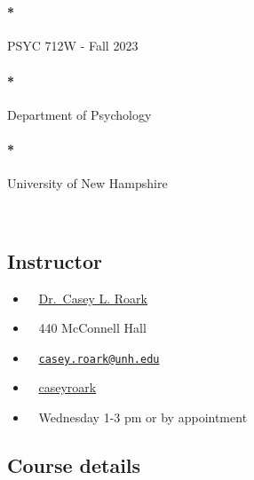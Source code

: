 \documentclass[
  letterpaper,
  DIV=11,
  numbers=noendperiod]{scrreprt}
\let\oldparagraph\paragraph
\renewcommand{\paragraph}[1]{\oldparagraph{#1}\mbox{}}
\providecommand{\tightlist}{%
  \setlength{\itemsep}{0pt}\setlength{\parskip}{0pt}}\usepackage{longtable,booktabs,array}
\begin{document}
~

\hypertarget{psyc-712w---fall-2023}{%
\paragraph*{\texorpdfstring{{PSYC 712W - Fall
2023}}{PSYC 712W - Fall 2023}}\label{psyc-712w---fall-2023}}

\hypertarget{department-of-psychology}{%
\paragraph*{\texorpdfstring{{Department of
Psychology}}{Department of Psychology}}\label{department-of-psychology}}

\hypertarget{university-of-new-hampshire}{%
\paragraph*{\texorpdfstring{{University of New
Hampshire}}{University of New Hampshire}}\label{university-of-new-hampshire}}

~

\hypertarget{instructor}{%
\subsection*{Instructor}\label{instructor}}

\begin{itemize}
\tightlist
\item
   ~ \href{https://www.roarklab.com}{Dr.~Casey L. Roark}
\item
   ~ 440 McConnell Hall
\item
   ~
  \href{mailto:casey.roark@unh.edu}{\nolinkurl{casey.roark@unh.edu}}
\item
   ~
  \href{https://www.twitter.com/caseyroark}{caseyroark}
\item
   ~ Wednesday 1-3 pm or by appointment
\end{itemize}

\hypertarget{course-details}{%
\subsection*{Course details}\label{course-details}}
\end{document}
